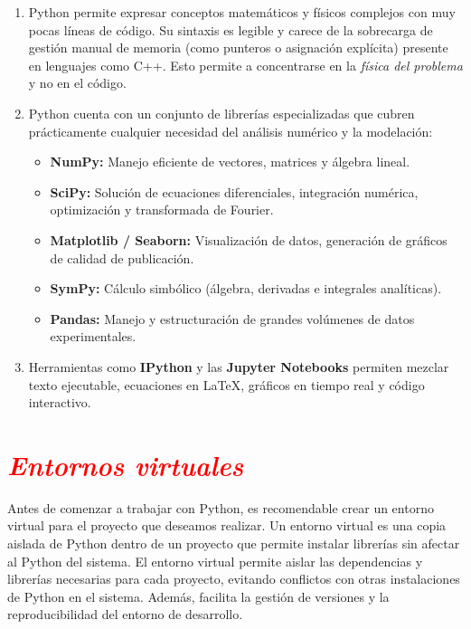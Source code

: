 \documentclass[12pt]{article}
\begin{document}
\begin{enumerate}
    \item Python permite expresar conceptos matemáticos y físicos complejos con muy pocas 
    líneas de código. Su sintaxis es legible y carece de la sobrecarga de gestión manual 
    de memoria (como punteros o asignación explícita) presente en lenguajes como C++. 
    Esto permite a concentrarse en la \textit{física del problema} y no en el código.

    \item Python cuenta con un conjunto de librerías especializadas que cubren 
    prácticamente cualquier necesidad del análisis numérico y la modelación:
    \begin{itemize}
        \item \textbf{NumPy:} Manejo eficiente de vectores, matrices y álgebra lineal.
        \item \textbf{SciPy:} Solución de ecuaciones diferenciales, integración numérica, optimización y transformada de Fourier.
        \item \textbf{Matplotlib / Seaborn:} Visualización de datos, generación de gráficos de calidad de publicación.
        \item \textbf{SymPy:} Cálculo simbólico (álgebra, derivadas e integrales analíticas).
        \item \textbf{Pandas:} Manejo y estructuración de grandes volúmenes de datos experimentales.
    \end{itemize}

    \item Herramientas como \textbf{IPython} y las \textbf{Jupyter Notebooks} 
    permiten mezclar texto ejecutable, ecuaciones en \LaTeX, gráficos en tiempo real y 
    código interactivo.
\end{enumerate}

\section*{\textcolor{red}{\textit{Entornos virtuales}}}
	Antes de comenzar a trabajar con Python, es recomendable crear un entorno virtual para 
	el proyecto que deseamos realizar. Un entorno virtual es una copia aislada de Python 
    dentro de un proyecto que permite instalar librerías sin afectar al Python del sistema. 
	El entorno virtual permite aislar las dependencias y librerías 
	necesarias para cada proyecto, evitando conflictos con otras instalaciones de Python 
	en el sistema. Además, facilita la gestión de versiones y la reproducibilidad del entorno de 
	desarrollo. 
    
\end{document}

